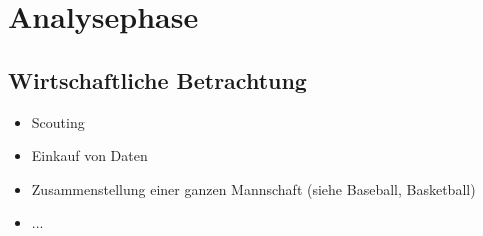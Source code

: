 \chapter{Analysephase}




\section{Wirtschaftliche Betrachtung}

\begin{itemize}
\item Scouting
\item Einkauf von Daten
\item Zusammenstellung einer ganzen Mannschaft (siehe Baseball, Basketball)
\item ...
\end{itemize}